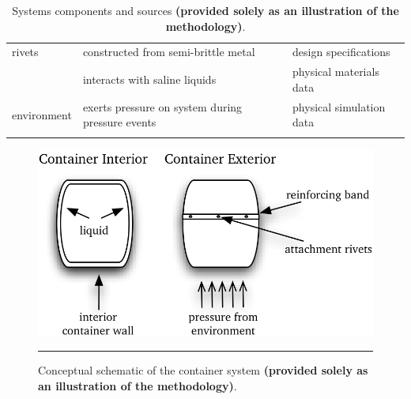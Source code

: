 \begin{table}
\begin{center}
\begin{tabular}{lll}
    \\\hline
    rivets           & constructed from semi-brittle metal                                      & design specifications     \\
    ~                & interacts with saline liquids                                            & physical materials data  
\\\hline
    environment     & exerts pressure on system during pressure events                          & physical simulation data 
    \\\Xhline{2\arrayrulewidth}
    \end{tabular}
    \small\caption{Systems components and sources \textbf{(provided solely as an illustration of the methodology)}.}\normalsize
\label{table:component_info}
\end{center}
\end{table}

\begin{figure}%
   \centering
    \includegraphics[width=0.6\columnwidth]{images/SIM/container_graphic_smallv3.png} 
   \small\caption[Container conceptual schematic]{Conceptual schematic of the container system \textbf{(provided solely as an illustration of the methodology)}.}\label{fig:container_schematic}\normalsize\hrule
\end{figure}

